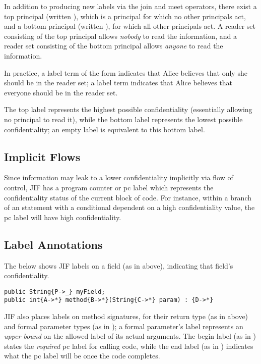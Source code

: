 In addition to producing new labels via the join and meet operators, there exist a top principal (written \code{*}), which is a principal for which no other principals act, and a bottom principal (written \code{_}), for which all other principals act. A reader set consisting of the top principal allows \textit{nobody} to read the information, and a reader set consisting of the bottom principal allows \textit{anyone} to read the information.

In practice, a label term of the form  indicates that Alice believes that only she should be in the reader set; a label term  indicates that Alice believes that everyone should be in the reader set.

The top label \jiflabel{*->*} represents the highest possible confidentiality (essentially allowing no principal to read it), while the bottom label \jiflabel{_->_} represents the lowest possible confidentiality; an empty label \jiflabel{} is equivalent to this bottom label.

\subsection{Implicit Flows}

Since information may leak to a lower confidentiality implicitly via flow of control, JIF has a program counter or pc label which represents the confidentiality status of the current block of code. For instance, within a branch of an  statement with a conditional dependent on a high confidentiality value, the pc label will have high confidentiality.

\subsection{Label Annotations}

The below shows JIF labels on a field (as in  above), indicating that field's confidentiality.

\begin{verbatim}
public String{P->_} myField;
public int{A->*} method{B->*}(String{C->*} param) : {D->*}
\end{verbatim}

JIF also places labels on method signatures, for their return type (as in  above) and formal parameter types (as in ); a formal parameter's label represents an \textit{upper bound} on the allowed label of its actual arguments. The begin label (as in ) states the \textit{required} pc label for calling code, while the end label (as in ) indicates what the pc label will be once the code completes.

